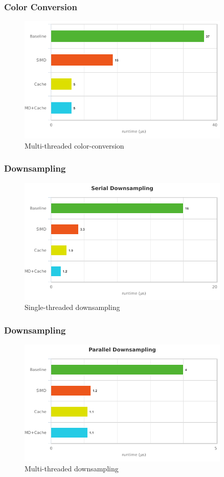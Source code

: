 \documentclass{beamer}
\begin{document}
\begin{frame}
  \frametitle{Color Conversion}
  \begin{figure}
  \includegraphics[width=0.9\textwidth]{images/pc}
  \caption{Multi-threaded color-conversion}
  \end{figure}
\end{frame}

\begin{frame}
  \frametitle{Downsampling}
  \begin{figure}
  \includegraphics[width=0.9\textwidth]{images/sd}
  \caption{Single-threaded downsampling}
  \end{figure}
\end{frame}

\begin{frame}
  \frametitle{Downsampling}
  \begin{figure}
  \includegraphics[width=0.9\textwidth]{images/pd}
  \caption{Multi-threaded downsampling}
  \end{figure}
\end{frame}
\end{document}
